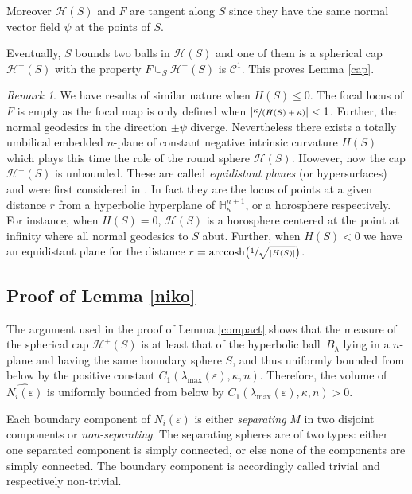 \documentclass[10pt]{amsart}
\let\mathcal\mathscr
\DeclareMathOperator{\arccosh}{arccosh}
\newcommand{\spfrac}[2]{\sfrac{#1}{(#2)}}
\theoremstyle{definition}
\theoremstyle{remark}
\newtheorem{remark}[theorem]{Remark}
\numberwithin{equation}{section}
\begin{document}
Moreover $\mathcal H(S)$ and $F$ are tangent along $S$ since they have the same
normal vector field $\psi$ at the points of $S$.

Eventually, $S$ bounds two balls in $\mathcal H(S)$ and one of them is a spherical cap
$\mathcal H^+(S)$ with the property $F\cup_S\mathcal H^+(S)$
is $\mathcal C^1$. This proves Lemma \ref{cap}.

\begin{remark}
We have results of similar nature when $H(S) \leq 0$. The focal locus of $F$ is empty as
the focal map is only defined when $\left|\spfrac{\kappa}{H(S)+\kappa}\right| <1$.
Further, the normal geodesics in the direction
$\pm \psi$ diverge. Nevertheless there exists a totally umbilical embedded
$n$-plane of constant negative intrinsic curvature $H(S)$
which plays this time the role of the round sphere $\mathcal H(S)$.
However, now the cap $\mathcal H^+(S)$ is unbounded.
These are called \emph{equidistant planes} (or hypersurfaces) and were
first considered in \cite{CR1}. In fact they are the locus of points at
a given distance $r$ from a hyperbolic hyperplane
of $\mathbb H^{n+1}_{\kappa}$, or a horosphere respectively.
For instance, when $H(S)=0$, $\mathcal H(S)$ is a
horosphere centered at the point at
infinity where all normal geodesics to $S$ abut.
Further, when $H(S) <0$ we have an equidistant plane for the distance
$r= \arccosh\bigl(\sfrac{1}{\sqrt{|H(S)|}}\bigr)$.
\end{remark}

\subsection{Proof of Lemma \ref{niko} }\label{proofniko}
The argument used in the proof of Lemma \ref{compact} shows that
the measure of the spherical cap $\mathcal H^+(S)$ is at least that of the hyperbolic ball~$B_{\lambda}$ lying in a $n$-plane and having the same boundary sphere $S$, and thus uniformly
bounded from below by the positive constant $C_1(\lambda_{\max}(\varepsilon),\kappa, n)$.
Therefore, the volume of $\widehat{N_i(\varepsilon)}$
is uniformly bounded from below by $C_1(\lambda_{\max}(\varepsilon), \kappa, n) >0$.

Each boundary component of $N_i(\varepsilon)$ is either \emph{separating} $M$ in two disjoint components or
\emph{non-separating}. The separating spheres are of two types: either one separated component is
simply connected, or else none of the components are simply connected.
The boundary component is accordingly called trivial and respectively non-trivial.
\end{document}
